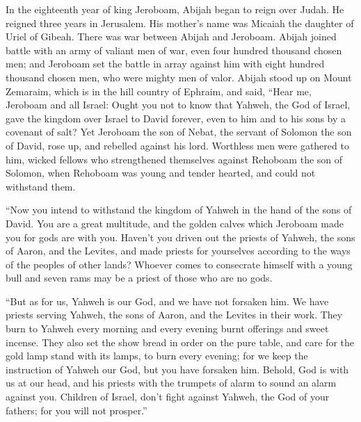  In the eighteenth year of king Jeroboam, Abijah began to
reign over Judah.  He reigned three years in Jerusalem. His
mother's name was Micaiah the daughter of Uriel of Gibeah. There was war
between Abijah and Jeroboam.  Abijah joined battle with an
army of valiant men of war, even four hundred thousand chosen men; and
Jeroboam set the battle in array against him with eight hundred thousand
chosen men, who were mighty men of valor.  Abijah stood up
on Mount Zemaraim, which is in the hill country of Ephraim, and said,
``Hear me, Jeroboam and all Israel:  Ought you not to know
that Yahweh, the God of Israel, gave the kingdom over Israel to David
forever, even to him and to his sons by a covenant of salt? 
Yet Jeroboam the son of Nebat, the servant of Solomon the son of David,
rose up, and rebelled against his lord.  Worthless men were
gathered to him, wicked fellows who strengthened themselves against
Rehoboam the son of Solomon, when Rehoboam was young and tender hearted,
and could not withstand them.

 ``Now you intend to withstand the kingdom of Yahweh in the
hand of the sons of David. You are a great multitude, and the golden
calves which Jeroboam made you for gods are with you. 
Haven't you driven out the priests of Yahweh, the sons of Aaron, and the
Levites, and made priests for yourselves according to the ways of the
peoples of other lands? Whoever comes to consecrate himself with a young
bull and seven rams may be a priest of those who are no gods.

 ``But as for us, Yahweh is our God, and we have not
forsaken him. We have priests serving Yahweh, the sons of Aaron, and the
Levites in their work.  They burn to Yahweh every morning
and every evening burnt offerings and sweet incense. They also set the
show bread in order on the pure table, and care for the gold lamp stand
with its lamps, to burn every evening; for we keep the instruction of
Yahweh our God, but you have forsaken him.  Behold, God is
with us at our head, and his priests with the trumpets of alarm to sound
an alarm against you. Children of Israel, don't fight against Yahweh,
the God of your fathers; for you will not prosper.''

